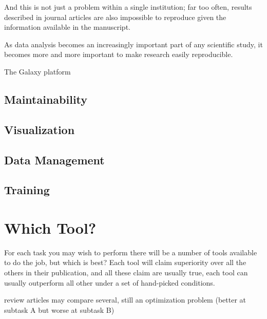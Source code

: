 And this is not just a problem within a single institution; far too often, results described in journal articles are also impossible to reproduce given the information available in the manuscript.

As data analysis becomes an increasingly important part of any scientific study, it becomes more and more important to make research easily reproducible.

The Galaxy platform

\subsection{Maintainability}
\subsection{Visualization}
\subsection{Data Management}
\subsection{Training}



\section{Which Tool?}
For each task you may wish to perform there will be a number of tools available to do the job, but which is best? Each tool will claim superiority over all the others in their publication, and all these claim are usually true, each tool can usually outperform all other under a set of hand-picked conditions.

review articles may compare several, still an optimization problem (better at subtask A but worse at subtask B)

